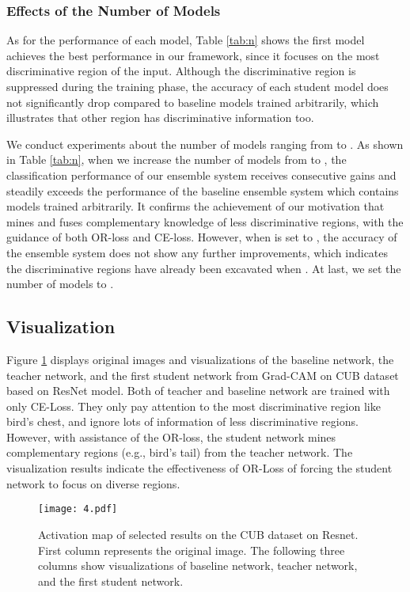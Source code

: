 \documentclass{article}
\begin{document}
\subsubsection{Effects of the Number of Models }

As for the performance of each model, Table \ref{tab:n} shows the first model achieves the best performance in our framework, since it focuses on the most discriminative region of the input. Although the discriminative region is suppressed during the training phase, the accuracy of each student model does not significantly drop compared to baseline models trained arbitrarily, which illustrates that other region has discriminative information too.  

We conduct experiments about the number of models  ranging from  to . As shown in Table \ref{tab:n}, when we increase the number of models from  to , the classification performance of our ensemble system receives consecutive gains and steadily exceeds the performance of the baseline ensemble system which contains  models trained arbitrarily. It confirms the achievement of our motivation that mines and fuses complementary knowledge of less discriminative regions, with the guidance of both OR-loss and CE-loss. However, when  is set to , the accuracy of the ensemble system does not show any further improvements, which indicates the discriminative regions have already been excavated when . At last, we set the number of models  to . 



  






\subsection{Visualization}
Figure \ref{fig:photo4} displays original images and visualizations of the baseline network, the teacher network, and the first student network from Grad-CAM on CUB dataset based on ResNet model. Both of teacher and baseline network are trained with only CE-Loss. They only pay attention to the most discriminative region like bird's chest, and ignore lots of information of less discriminative regions. However, with assistance of the OR-loss, the student network mines complementary regions (e.g., bird's tail) from the teacher network. The visualization results indicate the effectiveness of OR-Loss of forcing the student network to focus on diverse regions.

\begin{figure}[!t]
\centering
\texttt{[image: 4.pdf]}
\caption{Activation map of selected results on the CUB dataset on Resnet. First column represents the original image. The following three columns show visualizations of baseline network, teacher network, and the first student network.}
\label{fig:photo4}
\end{figure}
\end{document}

